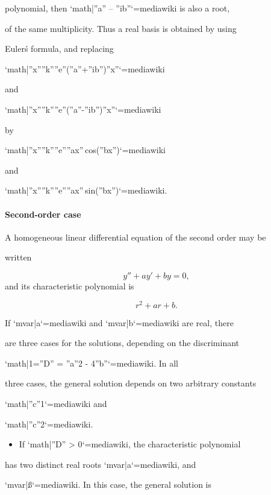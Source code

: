 polynomial, then `{{math|''a'' – ''ib''}}`{=mediawiki} is also a root,

of the same multiplicity. Thus a real basis is obtained by using

Euler\'s formula, and replacing

`{{math|''x''''k''''e''(''a''+''ib'')''x''}}`{=mediawiki}

and

`{{math|''x''''k''''e''(''a''-''ib'')''x''}}`{=mediawiki}

by

`{{math|''x''''k''''e''''ax'' cos(''bx'')}}`{=mediawiki}

and

`{{math|''x''''k''''e''''ax'' sin(''bx'')}}`{=mediawiki}.



\paragraph{Second-order case}



A homogeneous linear differential equation of the second order may be

written



$$y'' + ay' + by = 0,$$ and its characteristic polynomial is



$$r^2 + ar + b.$$



If `{{mvar|a}}`{=mediawiki} and `{{mvar|b}}`{=mediawiki} are real, there

are three cases for the solutions, depending on the discriminant

`{{math|1=''D'' = ''a''2 - 4''b''}}`{=mediawiki}. In all

three cases, the general solution depends on two arbitrary constants

`{{math|''c''1}}`{=mediawiki} and

`{{math|''c''2}}`{=mediawiki}.



\begin{itemize}
    \item If `{{math|''D'' > 0}}`{=mediawiki}, the characteristic polynomial
\end{itemize}
    has two distinct real roots `{{mvar|a}}`{=mediawiki}, and

    `{{mvar|ß}}`{=mediawiki}. In this case, the general solution is



